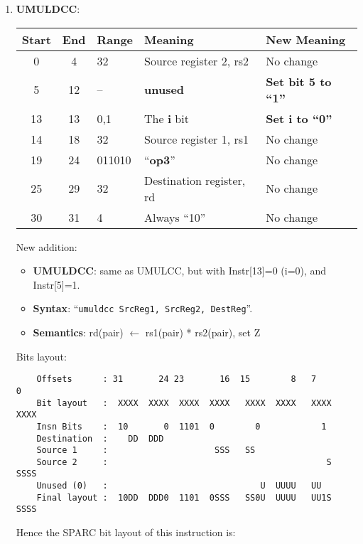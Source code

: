 \begin{enumerate}
\item \textbf{UMULDCC}:\\
  \begin{center}
    \begin{tabular}[p]{|c|c|l|l|l|}
      \hline
      \textbf{Start} & \textbf{End} & \textbf{Range} & \textbf{Meaning} &
                                                                          \textbf{New Meaning}\\
      \hline
      0 & 4 & 32 & Source register 2, rs2 & No change \\
      5 & 12 & -- & \textbf{unused} & \textbf{Set bit 5 to ``1''} \\
      13 & 13 & 0,1 & The \textbf{i} bit & \textbf{Set i to ``0''} \\
      14 & 18 & 32 & Source register 1, rs1 & No change \\
      19 & 24 & 011010 & ``\textbf{op3}'' & No change \\
      25 & 29 & 32 & Destination register, rd & No change \\
      30 & 31 & 4 & Always ``10'' & No change \\
      \hline
    \end{tabular}
  \end{center}
  New addition:
  \begin{itemize}
  \item []\textbf{UMULDCC}: same as UMULCC, but with Instr[13]=0 (i=0), and
    Instr[5]=1.
  \item []\textbf{Syntax}: ``\texttt{umuldcc  SrcReg1, SrcReg2, DestReg}''.
  \item []\textbf{Semantics}: rd(pair) $\leftarrow$ rs1(pair) * rs2(pair), set Z
  \end{itemize}
  Bits layout:
\begin{verbatim}
    Offsets      : 31       24 23       16  15        8   7        0
    Bit layout   :  XXXX  XXXX  XXXX  XXXX   XXXX  XXXX   XXXX  XXXX
    Insn Bits    :  10       0  1101  0        0            1       
    Destination  :    DD  DDD                                       
    Source 1     :                     SSS   SS
    Source 2     :                                           S  SSSS
    Unused (0)   :                              U  UUUU   UU        
    Final layout :  10DD  DDD0  1101  0SSS   SS0U  UUUU   UU1S  SSSS
\end{verbatim}

  Hence the SPARC bit layout of this instruction is:


\end{enumerate}
